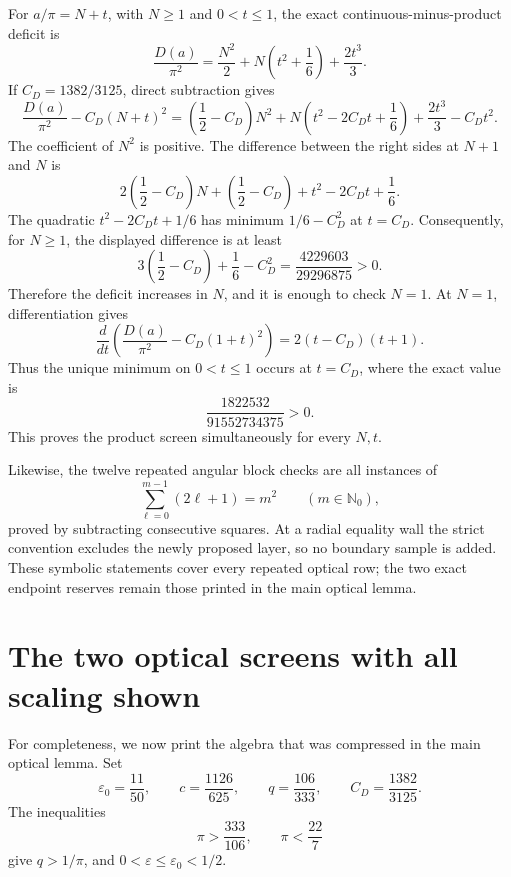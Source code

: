 \documentclass[11pt]{article}
\begin{document}
For \(a/\pi=N+t\), with \(N\geq1\) and \(0<t\leq1\), the exact
continuous-minus-product deficit is
\begin{equation}
 \frac{D(a)}{\pi^2}
 =\frac{N^2}{2}+N\left(t^2+\frac16\right)
  +\frac{2t^3}{3}.
 \label{eq:product-deficit}
\end{equation}
If \(C_D=1382/3125\), direct subtraction gives
\begin{equation}
 \frac{D(a)}{\pi^2}-C_D(N+t)^2
 =\left(\frac12-C_D\right)N^2
  +N\left(t^2-2C_Dt+\frac16\right)
  +\frac{2t^3}{3}-C_Dt^2.
 \label{eq:product-symbolic}
\end{equation}
The coefficient of \(N^2\) is positive. The difference between the
right sides at \(N+1\) and \(N\) is
\[
 2\left(\frac12-C_D\right)N
 +\left(\frac12-C_D\right)
 +t^2-2C_Dt+\frac16.
\]
The quadratic \(t^2-2C_Dt+1/6\) has minimum
\(1/6-C_D^2\) at \(t=C_D\).
Consequently, for \(N\geq1\), the displayed difference is at least
\[
 3\left(\frac12-C_D\right)+\frac16-C_D^2
 =\frac{4229603}{29296875}>0.
\]
Therefore the deficit increases in \(N\), and it is enough to check
\(N=1\). At \(N=1\), differentiation gives
\[
 \frac{d}{dt}\left(
 \frac{D(a)}{\pi^2}-C_D(1+t)^2
 \right)=2(t-C_D)(t+1).
\]
Thus the unique minimum on \(0<t\leq1\) occurs at \(t=C_D\), where the
exact value is
\begin{equation}
       \frac{1822532}{91552734375}>0.
       \label{eq:product-minimum}
\end{equation}
This proves the product screen simultaneously for every \(N,t\).

Likewise, the twelve repeated angular block checks are all instances of
\begin{equation}
       \sum_{\ell=0}^{m-1}(2\ell+1)=m^2
       \qquad(m\in\mathbb N_0),
       \label{eq:odd-sum}
\end{equation}
proved by subtracting consecutive squares. At a radial equality wall the
strict convention excludes the newly proposed layer, so no boundary
sample is added. These symbolic statements cover every repeated optical
row; the two exact endpoint reserves remain those printed in the main
optical lemma.

\section{The two optical screens with all scaling shown}

For completeness, we now print the algebra that was compressed in the main
optical lemma. Set
\[
 \varepsilon_0=\frac{11}{50},\qquad
 c=\frac{1126}{625},\qquad
 q=\frac{106}{333},\qquad
 C_D=\frac{1382}{3125}.
\]
The inequalities
\[
 \pi>\frac{333}{106},\qquad \pi<\frac{22}{7}
\]
give \(q>1/\pi\), and \(0<\varepsilon\leq\varepsilon_0<1/2\).
\end{document}
